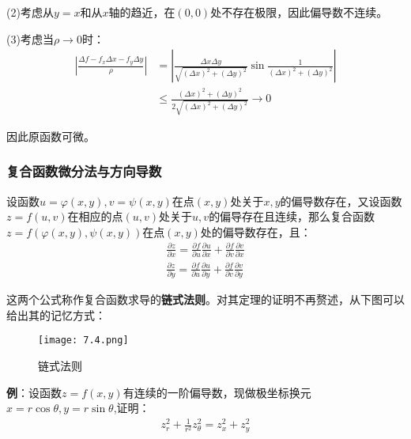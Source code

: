 \documentclass{ctexart}
\let\oldtextbf\textbf %
\renewcommand{\textbf}[1]{\textcolor{btex}{\oldtextbf{#1}}} %
\begin{document}
(2)考虑从$y=x$和从$x$轴的趋近，在$(0,0)$处不存在极限，因此偏导数不连续。

(3)考虑当$\rho\to 0$时：
\begin{align*}
    |\frac{\Delta f-f_x\Delta x-f_y\Delta y}{\rho}|&=|\frac{\Delta x\Delta y}{\sqrt{(\Delta x)^2+(\Delta y)^2}}\sin\frac{1}{(\Delta x)^2+(\Delta y)^2}|\\
    &\leq\frac{(\Delta x)^2+(\Delta y)^2}{2\sqrt{(\Delta x)^2+(\Delta y)^2}}\to 0
\end{align*}

因此原函数可微。

\subsubsection{复合函数微分法与方向导数}
\begin{tcolorbox}[
    colback=bac1,     %
    colframe=fra1,   %
    coltitle=white,             %
    coltext=tex1,
    title=复合函数微分法,
    fonttitle=\bfseries,        %
arc=3mm,                     %
breakable
]
设函数$u=\varphi(x,y),v=\psi(x,y)$在点$(x,y)$处关于$x,y$的偏导数存在，又设函数$z=f(u,v)$在相应的点$(u,v)$处关于$u,v$的偏导存在且连续，那么复合函数$z=f(\varphi(x,y),\psi(x,y))$在点$(x,y)$处的偏导数存在，且：
\begin{align*}
    \frac{\partial z}{\partial x}=\frac{\partial f}{\partial u}\frac{\partial u}{\partial x}+\frac{\partial f}{\partial v}\frac{\partial v}{\partial x}\\
     \frac{\partial z}{\partial y}=\frac{\partial f}{\partial u}\frac{\partial u}{\partial y}+\frac{\partial f}{\partial v}\frac{\partial v}{\partial y}\tag{7-7}
\end{align*}

这两个公式称作复合函数求导的\textbf{链式法则}。对其定理的证明不再赘述，从下图可以给出其的记忆方式：
\begin{figure}[H]    
\centering     
\renewcommand{\figurename}{图}     
\renewcommand{\thefigure}{7.4}    
\begin{myimagebox}[width=0.5\textwidth] %
\texttt{[image: 7.4.png]} %
\end{myimagebox}     
\caption{\label{fig:7.4}链式法则}   
\end{figure}
\end{tcolorbox}

\textbf{例}：设函数$z=f(x,y)$有连续的一阶偏导数，现做极坐标换元$x=r\cos\theta,y=r\sin\theta$,证明：
\begin{align*}
    z_r^2+\frac{1}{r^2}z_\theta^2=z_x^2+z_y^2
\end{align*}
\end{document}
